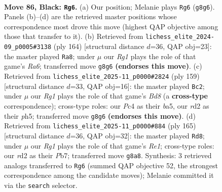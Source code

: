 \documentclass[11pt]{article}
\begin{document}
\clearpage

\begin{figure}[p]\centering
\begin{subfigure}{0.46\textwidth}\centering
\resizebox{\linewidth}{!}{%
\newchessgame
\chessboard[
  setfen={6r1/8/p3k3/Ppp2p1p/2p2P1P/4PKP1/1P1R4/8 b - - 18 86},
  showmover=false,
  pgfstyle=straightmove, color=movearrow, markmove={g8-g6}
]}
\caption{}
\end{subfigure}\hfill
\begin{subfigure}{0.46\textwidth}\centering
\resizebox{\linewidth}{!}{%
\newchessgame
\chessboard[
  setfen={8/5r1p/R5pP/4kpP1/4p3/4P1K1/5P2/8 w - - 50 83},
  showmover=false,
  pgfstyle=straightmove, color=movearrow, markmove={a6-a8}
]}
\caption{}
\end{subfigure}
\\[4pt]
\begin{subfigure}{0.46\textwidth}\centering
\resizebox{\linewidth}{!}{%
\newchessgame
\chessboard[
  setfen={8/5kp1/p4p1p/Bp1p3P/3P2P1/P1P2PK1/8/3b4 b - - 40 80},
  showmover=false,
  pgfstyle=straightmove, color=movearrow, markmove={d1-c2}
]}
\caption{}
\end{subfigure}\hfill
\begin{subfigure}{0.46\textwidth}\centering
\resizebox{\linewidth}{!}{%
\newchessgame
\chessboard[
  setfen={4r3/1p6/p1p2kp1/P6p/1P3P1P/4PK2/2R5/8 b - - 2 83},
  showmover=false,
  pgfstyle=straightmove, color=movearrow, markmove={e8-d8}
]}
\caption{}
\end{subfigure}
\caption{\textbf{Move 86, Black: \texttt{Rg6}.} (a) Our position; Melanie plays \texttt{Rg6} (\texttt{g8g6}). Panels (b)--(d) are the retrieved master positions whose correspondence most drove this move (highest QAP objective among those that transfer to it). (b) Retrieved from \texttt{lichess\_elite\_2024-09\_p0005\#3138} (ply 164) [structural distance $d$=36, QAP obj=23]: the master played \texttt{Ra8}; under $\mu$ our \emph{Rg1} plays the role of that game's \emph{Ra6}; transferred move \texttt{g8g6} \textbf{(endorses this move)}. (c) Retrieved from \texttt{lichess\_elite\_2025-11\_p0000\#2824} (ply 159) [structural distance $d$=33, QAP obj=16]: the master played \texttt{Bc2}; under $\mu$ our \emph{Rg1} plays the role of that game's \emph{Bd8} (a \textbf{cross-type} correspondence); cross-type roles: our \emph{P}c4 as their \emph{b}a5, our \emph{r}d2 as their \emph{p}h5; transferred move \texttt{g8g6} \textbf{(endorses this move)}. (d) Retrieved from \texttt{lichess\_elite\_2025-11\_p0000\#884} (ply 165) [structural distance $d$=36, QAP obj=32]: the master played \texttt{Rd8}; under $\mu$ our \emph{Rg1} plays the role of that game's \emph{Re1}; cross-type roles: our \emph{r}d2 as their \emph{P}b7; transferred move \texttt{g8a8}. Synthesis: 3 retrieved analogs transferred to \texttt{Rg6} (summed QAP objective 52, the strongest correspondence among the candidate moves); Melanie committed it via the \texttt{search} selector.}
\label{fig:thought-m171}
\end{figure}
\end{document}
